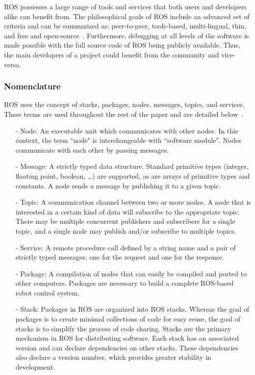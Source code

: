 ROS possesses a large range of tools and services that both users and developers alike can benefit from. The philosophical goals of ROS include an advanced set of criteria and can be summarized as: peer-to-peer, tools-based, multi-lingual, thin, and free and open-source~\cite{QUIGLEY.ICRA.2009}. Furthermore, debugging at all levels of the software is made possible with the full source code of ROS being publicly available. Thus, the main developers of a project could benefit from the community and vice-versa.

\subsubsection*{Nomenclature}

ROS uses the concept of stacks, packages, nodes, messages, topics, and services. These terms are used throughout the rest of the paper and are detailed below~\cite{QUIGLEY.ICRA.2009}.
\begin{itemize}
\item[-] Node: An executable unit which communicates with other nodes. In this context, the
term ``node" is interchangeable with ``software module". Nodes communicate with each other by passing messages.
\item[-] Message: A strictly typed data structure. Standard
primitive types (integer, floating point, boolean, \ldots) are
supported, as are arrays of primitive types and constants. A node sends a message by publishing it to a given topic.
\item[-] Topic: A communication channel between two or more
nodes. A node that is interested in a certain kind of data will subscribe
to the appropriate topic. There may be multiple concurrent
publishers and subscribers for a single topic, and a single
node may publish and/or subscribe to multiple topics.
\item[-] Service: A remote procedure call defined by a string name and a pair
of strictly typed messages: one for the request and one for
the response.
\item[-] Package: A compilation of nodes that can easily be compiled and ported to other computers. Packages are necessary to build a complete ROS-based robot control system.
\item[-] Stack: Packages in ROS are organized into ROS stacks. Whereas the goal of packages is to create minimal collections of code for easy reuse, the goal of stacks is to simplify the process of code sharing. Stacks are the primary mechanism in ROS for distributing software. Each stack has an associated version and can declare dependencies on other stacks. These dependencies also declare a version number, which provides greater stability in development.

\end{itemize} 